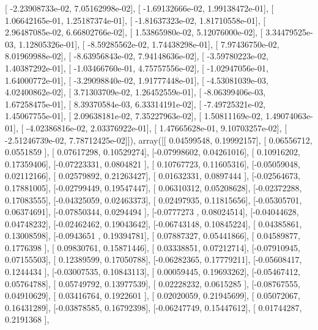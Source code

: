 \documentclass{article}
\begin{document}
       [ -2.23908733e-02,   7.05162998e-02],
       [ -1.69132666e-02,   1.99138472e-01],
       [  1.06642165e-01,   1.25187374e-01],
       [ -1.81637323e-02,   1.81710558e-01],
       [  2.96487085e-02,   6.66802766e-02],
       [  1.53865980e-02,   5.12076000e-02],
       [  3.34479525e-03,   1.12805326e-01],
       [ -8.59285562e-02,   1.74438298e-01],
       [  7.97436750e-02,   8.01969988e-02],
       [ -8.63956843e-02,   7.94148636e-02],
       [ -3.59780223e-02,   1.40387292e-01],
       [ -1.03466760e-01,   4.75757556e-02],
       [ -1.02947056e-01,   1.64000772e-01],
       [ -3.29098840e-02,   1.91777448e-01],
       [ -4.53081039e-03,   4.02400862e-02],
       [  3.71303709e-02,   1.26452559e-01],
       [ -8.06399406e-03,   1.67258475e-01],
       [  8.39370584e-03,   6.33314191e-02],
       [ -7.49725321e-02,   1.45067755e-01],
       [  2.09638181e-02,   7.35227963e-02],
       [  1.50811169e-02,   1.49074063e-01],
       [ -4.02386816e-02,   2.03376922e-01],
       [  1.47665628e-01,   9.10703257e-02],
       [ -2.51246739e-02,   7.78712425e-02]]), array([[ 0.04599548,  0.19992157],
       [ 0.06556712,  0.0551859 ],
       [ 0.07617298,  0.10529274],
       [-0.07998602,  0.04261016],
       [ 0.10916202,  0.17359406],
       [-0.07223331,  0.0804821 ],
       [ 0.10767723,  0.11605316],
       [-0.05059048,  0.02112166],
       [ 0.02579892,  0.21263427],
       [ 0.01632331,  0.0897444 ],
       [-0.02564673,  0.17881005],
       [-0.02799449,  0.19547447],
       [ 0.06310312,  0.05208628],
       [-0.02372288,  0.17083555],
       [-0.04325059,  0.02463373],
       [ 0.02497935,  0.11815656],
       [-0.05305701,  0.06374691],
       [-0.07850344,  0.0294494 ],
       [-0.0777273 ,  0.08024514],
       [-0.04044628,  0.04748232],
       [-0.02462462,  0.19043642],
       [-0.06743148,  0.10845224],
       [ 0.04385861,  0.13008598],
       [-0.0943651 ,  0.19394781],
       [ 0.07887327,  0.05441866],
       [ 0.04589877,  0.1776398 ],
       [ 0.09830761,  0.15871446],
       [ 0.03338851,  0.07212714],
       [-0.07910945,  0.07155503],
       [ 0.12389599,  0.17050788],
       [-0.06282365,  0.17779211],
       [-0.05608417,  0.1244434 ],
       [-0.03007535,  0.10843113],
       [ 0.00059445,  0.19693262],
       [-0.05467412,  0.05764788],
       [ 0.05749792,  0.13977539],
       [ 0.02228232,  0.0615285 ],
       [-0.08767555,  0.04910629],
       [ 0.03416764,  0.1922601 ],
       [ 0.02020059,  0.21945699],
       [ 0.05072067,  0.16431289],
       [-0.03878585,  0.16792398],
       [-0.06247749,  0.15447612],
       [ 0.01744287,  0.2191368 ],
\end{document}
